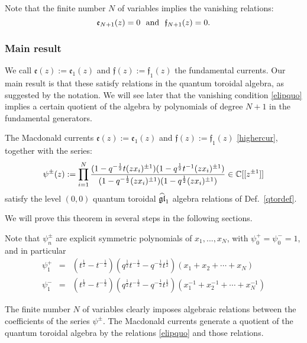 Note that the finite number $N$ of variables implies the vanishing relations:
\begin{equation}\label{elipquo} {\mathfrak e}_{N+1}(z)=0 \ \ {\rm and} \ \ {\mathfrak f}_{N+1}(z)=0 .
\end{equation}


\subsubsection{Main result}
We call ${\mathfrak e}(z):={\mathfrak e}_1(z)$ and ${\mathfrak f}(z):={\mathfrak f}_1(z)$ the fundamental currents. Our main result is that these satisfy relations in the quantum toroidal algebra, as suggested by the notation. We will see later that the vanishing condition \eqref{elipquo} implies a certain quotient of the algebra by polynomials of degree $N+1$ in the fundamental generators.

\begin{thm}\label{gentoro}
The Macdonald currents ${\mathfrak e}(z):={\mathfrak e}_1(z)$ and ${\mathfrak f}(z):={\mathfrak f}_1(z)$ \eqref{highercur},
together with the series:
\begin{equation}\label{defpsipm}
\psi^{\pm}(z):=\prod_{i=1}^{N} 
\frac{(1-q^{-\frac{1}{2}}t (z x_i)^{\pm 1})(1-q^{\frac{1}{2}}t^{-1} (z x_i)^{\pm 1})}{(1-q^{-\frac{1}{2}} (z x_i)^{\pm 1})(1-q^{\frac{1}{2}} (z x_i)^{\pm 1})} \in {\mathbb C}[[z^{\pm 1}]]
\end{equation}
satisfy the level $(0,0)$ quantum toroidal $\widehat{{\mathfrak{gl}}}_1$ algebra relations of Def.~\ref{qtordef}.
\end{thm}

We will prove this theorem in several steps in the following sections.

Note that $\psi^\pm_n$ are explicit symmetric polynomials of $x_1,...,x_N$, with $\psi_0^+=\psi_0^-=1$, and in particular 
\begin{eqnarray}
\psi_1^+&=&(t^{\frac{1}{2}}-t^{-\frac{1}{2}})(q^{\frac{1}{2}}t^{-\frac{1}{2}}-q^{-\frac{1}{2}}t^{\frac{1}{2}})
(x_1+x_2+\cdots+x_{N})\nonumber \\
\psi_1^-&=&(t^{\frac{1}{2}}-t^{-\frac{1}{2}})(q^{\frac{1}{2}}t^{-\frac{1}{2}}-q^{-\frac{1}{2}}t^{\frac{1}{2}})(x_1^{-1}+x_2^{-1}+\cdots+x_{N}^{-1})\label{psiones}
\end{eqnarray}

The finite number $N$ of variables clearly imposes algebraic relations between the coefficients of the series $\psi^\pm$.
The Macdonald currents generate a quotient of the quantum toroidal algebra by the relations \eqref{elipquo}
and those relations.


